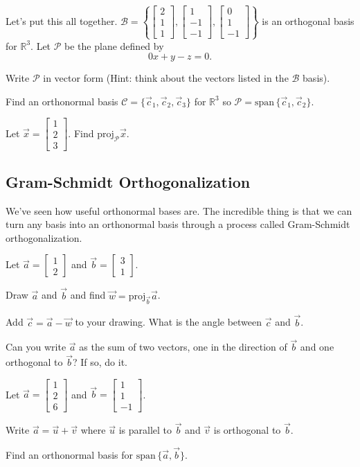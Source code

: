 \documentclass{problemset}
\newcommand{\R}{\mathbb{R}}
\newcommand{\proj}{\mathrm{proj}}
\renewcommand{\span}{\mathrm{span}\,}
\newcommand{\mat}[1]{\begin{bmatrix}#1\end{bmatrix}}
\begin{document}
	\question
	Let's put this all together.  
	$\mathcal B=\left\{\mat{2\\1\\1},\mat{1\\-1\\-1},\mat{0\\1\\-1}\right\}$ is an
	orthogonal basis for $\R^3$.  Let $\mathcal P$ be the plane defined
	by
	\[
		0x+y-z=0.
	\]
	\begin{parts}
		\item Write $\mathcal P$ in vector form (Hint: think about the vectors
			listed in the $\mathcal B$ basis).
		\item Find an orthonormal basis $\mathcal C=\{\vec c_1,\vec c_2,\vec c_3\}$
			for $\R^3$ so $\mathcal P=\span\{\vec c_1,\vec c_2\}$.
		\item Let $\vec x=\mat{1\\2\\3}$.  Find $\proj_{\mathcal P}\vec x$.
	\end{parts}

\subsection*{Gram-Schmidt Orthogonalization}
	We've seen how useful orthonormal bases are.  The incredible thing is that we can 
	turn any basis into an orthonormal basis through a process called
	Gram-Schmidt orthogonalization.

	\question
	Let $\vec a=\mat{1\\2}$ and $\vec b=\mat{3\\1}$.
	\begin{parts}
		\item Draw $\vec a$ and $\vec b$ and find $\vec w=\proj_{\vec b}\vec a$.
		\item Add $\vec c=\vec a-\vec w$ to your drawing.  What is the angle between
			$\vec c$ and $\vec b$.
		\item Can you write $\vec a$ as the sum of two vectors, one in 
			the direction of $\vec b$ and one orthogonal to $\vec b$?
			If so, do it.
	\end{parts}

	\question
	Let $\vec a=\mat{1\\2\\6}$ and $\vec b=\mat{1\\1\\-1}$.
	\begin{parts}
		\item Write $\vec a=\vec u+\vec v$ where $\vec u$ is parallel to
			$\vec b$ and $\vec v$ is orthogonal to $\vec b$.
		\item Find an orthonormal basis for $\span\{\vec a,\vec b\}$.
	\end{parts}
\end{document}
